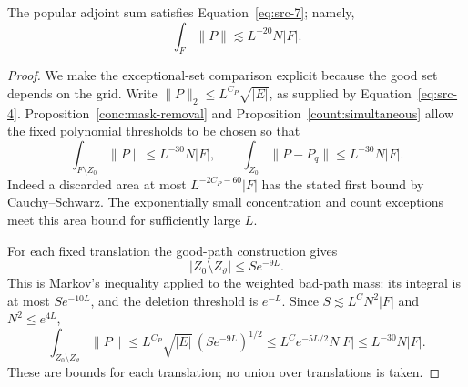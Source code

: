 \begin{theorem}
\label{assembly:improved-model}
The popular adjoint sum satisfies Equation~\eqref{eq:src-7}; namely,
\[
 \int_F\|P\|\lesssim L^{-20}N|F|.
\]
\end{theorem}

\begin{proof}
We make the exceptional-set comparison explicit because the good set
depends on the grid.  Write
\(\|P\|_2\le L^{C_P}\sqrt{|E|}\), as supplied by
Equation~\eqref{eq:src-4}.  Proposition~\ref{conc:mask-removal} and
Proposition~\ref{count:simultaneous} allow the fixed polynomial thresholds
to be chosen so that
\begin{equation}\label{assembly:fixed-exceptions}
 \int_{F\setminus Z_0}\|P\|\le L^{-30}N|F|,
 \qquad
 \int_{Z_0}\|P-P_q\|\le L^{-30}N|F|.
\end{equation}
Indeed a discarded area at most
\(L^{-2C_P-60}|F|\) has the stated first bound by Cauchy--Schwarz.
The exponentially small concentration and count exceptions meet this
area bound for sufficiently large \(L\).

For each fixed translation the good-path construction gives
\[
 |Z_0\setminus Z_\vartheta|\le S e^{-9L}.
\]
This is Markov's inequality applied to the weighted bad-path mass:
its integral is at most \(S e^{-10L}\), and the deletion threshold
is \(e^{-L}\).  Since \(S\lesssim L^C N^2|F|\) and
\(N^2\le e^{4L}\),
\begin{equation}\label{assembly:moving-exceptions}
 \int_{Z_0\setminus Z_\vartheta}\|P\|
       \le L^{C_P}\sqrt{|E|}\,(S e^{-9L})^{1/2}
       \le L^C e^{-5L/2}N|F|
       \le L^{-30}N|F|.
\end{equation}
These are bounds for each translation; no union over translations is
taken.


\end{proof}
